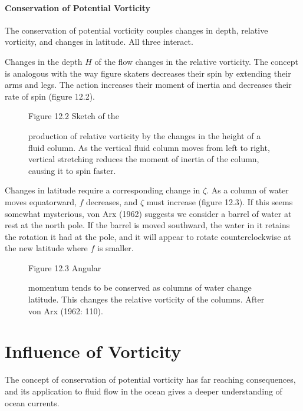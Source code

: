 \paragraph{Conservation of Potential Vorticity}
The conservation of
potential vorticity couples changes in depth, relative vorticity, and
changes in latitude. All three interact.
\begin{enumerate}
\vitem Changes in the depth $H$ of the flow changes in the relative
vorticity. The concept is analogous with the way figure skaters
decreases their spin by extending their arms and legs. The action
increases their moment of inertia and decreases their rate of spin
(figure 12.2).
\begin{figure}[h!]
\footnotesize
Figure 12.2 Sketch of the \rule{0pt}{4ex}production of relative
vorticity by the changes in the height of a fluid column. As the
vertical fluid column moves from left to right, vertical stretching
reduces the moment of inertia of the column, causing it to spin
faster.
\label{fig:spinsketch}
\vspace{-2ex}
\end{figure}
\vitem Changes in latitude require a corresponding change in
$\zeta$. As a column of water moves equatorward, $f$ decreases, and
$\zeta$ must increase (figure 12.3). If this seems somewhat
mysterious, von Arx (1962) suggests we consider a barrel of water at
rest at the north pole. If the barrel is moved southward, the water in
it retains the rotation it had at the pole, and it will appear to
rotate counterclockwise at the new latitude where $f$ is smaller.
\end{enumerate}
\begin{figure}[b!]
\centering
\footnotesize
Figure 12.3 Angular \rule{0pt}{6ex}momentum tends to be conserved as
columns of water change latitude. This changes the relative vorticity
of the columns. After von Arx (1962: 110).

\label{fig:planetaryvorticity}
\end{figure}

\section{Influence of Vorticity}
The concept of
conservation of potential vorticity has far reaching consequences, and
its application to fluid flow in the ocean gives a deeper
understanding of ocean currents.

